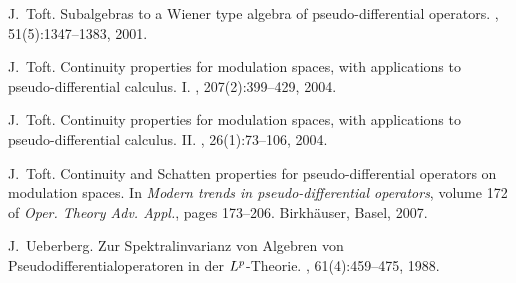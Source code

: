 \documentclass[12pt]{amsart}
\theoremstyle{definition}
\theoremstyle{remark}
\numberwithin{equation}{section}
\begin{document}
\begin{thebibliography}{10}
J.~Toft.
\newblock Subalgebras to a {W}iener type algebra of pseudo-differential
  operators.
, 51(5):1347--1383, 2001.

J.~Toft.
\newblock Continuity properties for modulation spaces, with applications to
  pseudo-differential calculus. {I}.
, 207(2):399--429, 2004.

J.~Toft.
\newblock Continuity properties for modulation spaces, with applications to
  pseudo-differential calculus. {II}.
, 26(1):73--106, 2004.

J.~Toft.
\newblock Continuity and {S}chatten properties for pseudo-differential
  operators on modulation spaces.
\newblock In {\em Modern trends in pseudo-differential operators}, volume 172
  of {\em Oper. Theory Adv. Appl.}, pages 173--206. Birkh\"auser, Basel, 2007.

J.~Ueberberg.
\newblock Zur {S}pektralinvarianz von {A}lgebren von
  {P}seudodifferentialoperatoren in der {$L\sp p$}-{T}heorie.
, 61(4):459--475, 1988.

\end{thebibliography}

% 
% 
\end{document}

